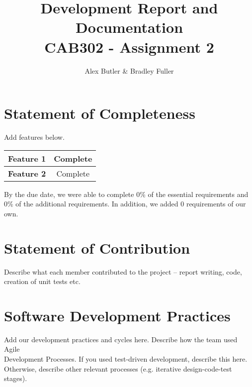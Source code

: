 \documentclass[12pt]{article} %
\begin{document}

    \title{Development Report and Documentation
    \\ \large CAB302 - Assignment 2}

    \author {Alex Butler \& Bradley Fuller}
    \maketitle

    \tableofcontents

    \newpage

    \section{Statement of Completeness}

    Add features below.
    \begin{center}
        \begin{tabular}{|c|c|}
            \hline  \textbf{Feature 1} & Complete \\
            \hline  \textbf{Feature 2} & Complete  \\
            \hline
        \end{tabular}
    \end{center}
    By the due date, we were able to complete 0\% of the essential requirements and 0\% of the additional requirements. In addition, we added 0 requirements of our own.

    \newpage

    \section{Statement of Contribution}

    Describe what each member contributed to the project – report writing, code, creation of unit tests etc.

    \newpage

    \section{Software Development Practices}

    Add our development practices and cycles here. Describe how the team used Agile \\
    Development Processes. If you used test-driven development, describe this here.\\
    Otherwise, describe other relevant processes (e.g. iterative design-code-test stages).
\end{document}
